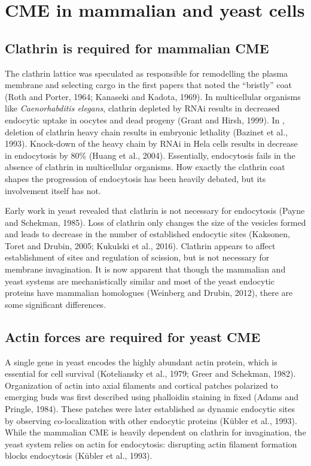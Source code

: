 	
\section{CME in mammalian and yeast cells }
		\subsection{Clathrin is required for mammalian CME}
The clathrin lattice was speculated as responsible for remodelling the plasma membrane and selecting cargo in the first papers that noted the “bristly” coat (Roth and Porter, 1964; Kanaseki and Kadota, 1969).  In multicellular organisms like \textit{Caenorhabditis elegans}, clathrin depleted by RNAi results in decreased endocytic uptake in oocytes and dead progeny (Grant and Hirsh, 1999). In , deletion of clathrin heavy chain results in embryonic lethality (Bazinet et al., 1993). Knock-down of the heavy chain by RNAi in Hela cells results in decrease in endocytosis by 80\% (Huang et al., 2004). Essentially, endocytosis fails in the absence of clathrin in multicellular organisms. How exactly the clathrin coat shapes the progression of endocytosis has been heavily debated, but its involvement itself has not. 

\vspace{5mm}
Early work in yeast revealed that clathrin is not necessary for endocytosis (Payne and Schekman, 1985). Loss of clathrin only changes the size of the vesicles formed and leads to decrease in the number of established endocytic sites (Kaksonen, Toret and Drubin, 2005; Kukulski et al., 2016). Clathrin appears to affect establishment of sites and regulation of scission, but is not necessary for membrane invagination. It is now apparent that though the mammalian and yeast systems are mechanistically similar and most of the yeast endocytic proteins have mammalian homologues (Weinberg and Drubin, 2012), there are some significant differences.


		\subsection{Actin forces are required for yeast CME}
A single gene in yeast encodes the highly abundant actin protein, which is essential for cell survival (Koteliansky et al., 1979; Greer and Schekman, 1982). Organization of actin into axial filaments and cortical patches polarized to emerging buds was first described using phalloidin staining in fixed  (Adams and Pringle, 1984). These patches were later established as dynamic endocytic sites by observing co-localization with other endocytic proteins (Kübler et al., 1993). While the mammalian CME is heavily dependent on clathrin for invagination, the yeast system relies on actin for endocytosis: disrupting actin filament formation blocks endocytosis (Kübler et al., 1993). 



